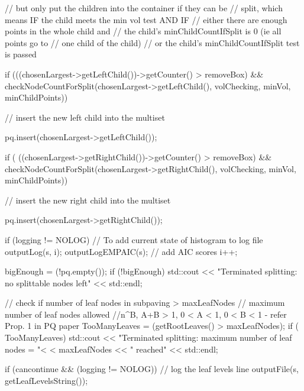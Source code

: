 \begin{DoxyCode}
{{{            // but only put the children into the container if they can be
            // split, which means IF the child meets the min vol test AND IF
            // either there are enough points in the whole child and
                // the child's minChildCountIfSplit is 0 (ie all points go to
                // one child of the child)
            // or the child's minChildCountIfSplit test is passed

            if (((chosenLargest->getLeftChild())->getCounter() > removeBox) &&
             checkNodeCountForSplit(chosenLargest->getLeftChild(),
                  volChecking, minVol, minChildPoints)) {
                // insert the new left child into the multiset
                
                pq.insert(chosenLargest->getLeftChild());
            }

            if ( ((chosenLargest->getRightChild())->getCounter() > removeBox) 
      &&
                 checkNodeCountForSplit(chosenLargest->getRightChild(),
                    volChecking, minVol, minChildPoints)) {
                // insert the new right child into the multiset
               
                pq.insert(chosenLargest->getRightChild());
            }

            if (logging != NOLOG) {
                // To add current state of histogram to log file
                outputLog(s, i);
                outputLogEMPAIC(s); // add AIC scores
                i++;
            }

            bigEnough = (!pq.empty());
            if (!bigEnough)
                std::cout << "Terminated splitting: no splittable nodes left"
                    << std::endl;
        
        
        // check if number of leaf nodes in subpaving > maxLeafNodes
        // maximum number of leaf nodes allowed
        //n^B, A+B > 1, 0  < A < 1, 0 < B < 1 - refer Prop. 1 in PQ paper
        TooManyLeaves = (getRootLeaves() > maxLeafNodes);
        if ( TooManyLeaves) {
          std::cout << "Terminated splitting: maximum number of leaf nodes = "<
      < maxLeafNodes << " reached"
                          << std::endl;
        }
      
      }
          

          
          if (cancontinue && (logging != NOLOG)) {
            // log the leaf levels line
            outputFile(s, getLeafLevelsString());
          }

}}
\end{DoxyCode}
